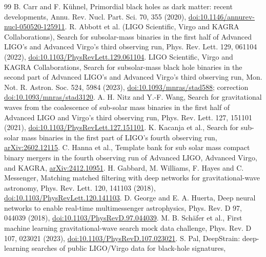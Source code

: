 \documentclass[11pt]{article}
\begin{document}
\begin{thebibliography}{99}\small
{} B. Carr and F. K\"uhnel, Primordial black holes as dark matter: recent developments,
Annu. Rev. Nucl. Part. Sci. 70, 355 (2020), \href{https://doi.org/10.1146/annurev-nucl-050520-125911}{doi:10.1146/annurev-nucl-050520-125911}.
 R. Abbott et al. (LIGO Scientific, Virgo and KAGRA Collaborations), Search for subsolar-mass
binaries in the first half of Advanced LIGO's and Advanced Virgo's third observing run, Phys. Rev. Lett. 129, 061104
(2022), \href{https://doi.org/10.1103/PhysRevLett.129.061104}{doi:10.1103/PhysRevLett.129.061104}.
 LIGO Scientific, Virgo and KAGRA Collaborations, Search for subsolar-mass black hole binaries in
the second part of Advanced LIGO's and Advanced Virgo's third observing run, Mon. Not. R. Astron. Soc. 524, 5984
(2023), \href{https://doi.org/10.1093/mnras/stad588}{doi:10.1093/mnras/stad588}; correction
\href{https://doi.org/10.1093/mnras/stad3120}{doi:10.1093/mnras/stad3120}.
 A. H. Nitz and Y.-F. Wang, Search for gravitational waves from the coalescence of sub-solar
mass binaries in the first half of Advanced LIGO and Virgo's third observing run, Phys. Rev. Lett. 127, 151101 (2021),
\href{https://doi.org/10.1103/PhysRevLett.127.151101}{doi:10.1103/PhysRevLett.127.151101}.
 K. Kacanja et al., Search for sub-solar mass binaries in the first part of LIGO's fourth
observing run, \href{https://arxiv.org/abs/2602.12115}{arXiv:2602.12115}.
 C. Hanna et al., Template bank for sub solar mass compact binary mergers in the fourth observing
run of Advanced LIGO, Advanced Virgo, and KAGRA, \href{https://arxiv.org/abs/2412.10951}{arXiv:2412.10951}.
 H. Gabbard, M. Williams, F. Hayes and C. Messenger, Matching matched filtering with deep networks
for gravitational-wave astronomy, Phys. Rev. Lett. 120, 141103 (2018),
\href{https://doi.org/10.1103/PhysRevLett.120.141103}{doi:10.1103/PhysRevLett.120.141103}.
 D. George and E. A. Huerta, Deep neural networks to enable real-time multimessenger
astrophysics, Phys. Rev. D 97, 044039 (2018), \href{https://doi.org/10.1103/PhysRevD.97.044039}{doi:10.1103/PhysRevD.97.044039}.
 M. B. Sch\"afer et al., First machine learning gravitational-wave search mock data challenge,
Phys. Rev. D 107, 023021 (2023), \href{https://doi.org/10.1103/PhysRevD.107.023021}{doi:10.1103/PhysRevD.107.023021}.
 S. Pal, DeepStrain: deep-learning searches of public LIGO/Virgo data for black-hole signatures,

\end{thebibliography}
\end{document}
